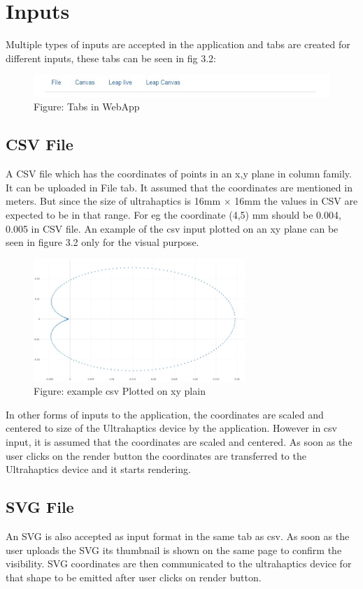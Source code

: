 \section{Inputs}
Multiple types of inputs are accepted in the application and tabs are 
created for different inputs, these tabs can be seen in fig 3.2:
\begin{figure}[htb]
	\includegraphics[width=140mm]{gfx/tabs.jpeg}
	\caption{Figure: Tabs in WebApp}
	\label{fig:features:tabs}
\end{figure}

\subsection*{CSV File}
A CSV file which has the coordinates of points in an x,y plane in column family. 
It can be uploaded in File tab. It assumed that 
the coordinates are mentioned in meters. But since the size of ultrahaptics is 16mm $\times$  16mm
the values in CSV are expected to be in that range. For eg the coordinate (4,5) mm 
should be 0.004, 0.005 in CSV file. An example of the csv input plotted on an xy plane 
can be seen in figure 3.2 only for the visual purpose. \\
\begin{figure}[htb]
	\includegraphics[width=80mm]{gfx/csvinput.jpeg}
	\caption{Figure: example csv Plotted on xy plain}
	\label{fig:features:csvinput}
\end{figure}
In other forms of inputs to the application, the 
coordinates are scaled and centered to size of the Ultrahaptics device by the application. 
However in csv input, it is assumed that the coordinates are scaled and centered.
As soon as the user clicks on the render button the coordinates are 
transferred to the Ultrahaptics device and it starts rendering.


\subsection*{SVG File}
An SVG is also accepted as input format in the same tab as csv. 
As soon as the user uploads the SVG its thumbnail is shown on the 
same page to confirm the visibility. 
SVG coordinates are then communicated to the ultrahaptics device for that shape to
be emitted after user clicks on render button. 


